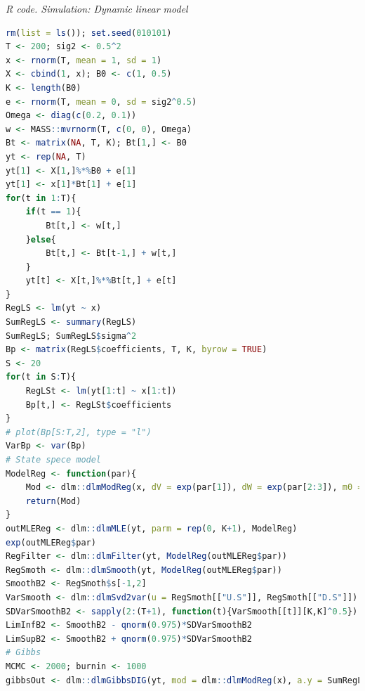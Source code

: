 \begin{tcolorbox}[enhanced,width=4.67in,center upper,
	fontupper=\large\bfseries,drop shadow southwest,sharp corners]
	\textit{R code. Simulation: Dynamic linear model}
	\begin{VF}
		\begin{lstlisting}[language=R]
rm(list = ls()); set.seed(010101)
T <- 200; sig2 <- 0.5^2
x <- rnorm(T, mean = 1, sd = 1) 
X <- cbind(1, x); B0 <- c(1, 0.5)
K <- length(B0)
e <- rnorm(T, mean = 0, sd = sig2^0.5)
Omega <- diag(c(0.2, 0.1))
w <- MASS::mvrnorm(T, c(0, 0), Omega)
Bt <- matrix(NA, T, K); Bt[1,] <- B0
yt <- rep(NA, T) 
yt[1] <- X[1,]%*%B0 + e[1]
yt[1] <- x[1]*Bt[1] + e[1]
for(t in 1:T){
	if(t == 1){
		Bt[t,] <- w[t,]
	}else{
		Bt[t,] <- Bt[t-1,] + w[t,]
	}
	yt[t] <- X[t,]%*%Bt[t,] + e[t]
}
RegLS <- lm(yt ~ x)
SumRegLS <- summary(RegLS)
SumRegLS; SumRegLS$sigma^2  
Bp <- matrix(RegLS$coefficients, T, K, byrow = TRUE)
S <- 20
for(t in S:T){
	RegLSt <- lm(yt[1:t] ~ x[1:t])
	Bp[t,] <- RegLSt$coefficients 
}
# plot(Bp[S:T,2], type = "l")
VarBp <- var(Bp)
# State spece model
ModelReg <- function(par){
	Mod <- dlm::dlmModReg(x, dV = exp(par[1]), dW = exp(par[2:3]), m0 = RegLS$coefficients,	C0 = VarBp)
	return(Mod)
}
outMLEReg <- dlm::dlmMLE(yt, parm = rep(0, K+1), ModelReg)
exp(outMLEReg$par)
RegFilter <- dlm::dlmFilter(yt, ModelReg(outMLEReg$par))
RegSmoth <- dlm::dlmSmooth(yt, ModelReg(outMLEReg$par))
SmoothB2 <- RegSmoth$s[-1,2]
VarSmooth <- dlm::dlmSvd2var(u = RegSmoth[["U.S"]], RegSmoth[["D.S"]])
SDVarSmoothB2 <- sapply(2:(T+1), function(t){VarSmooth[[t]][K,K]^0.5}) 
LimInfB2 <- SmoothB2 - qnorm(0.975)*SDVarSmoothB2
LimSupB2 <- SmoothB2 + qnorm(0.975)*SDVarSmoothB2
# Gibbs
MCMC <- 2000; burnin <- 1000
gibbsOut <- dlm::dlmGibbsDIG(yt, mod = dlm::dlmModReg(x), a.y = SumRegLS$sigma^2, b.y = 10*SumRegLS$sigma^2, a.theta = max(diag(VarBp)), b.theta = 10*max(diag(VarBp)), n.sample = MCMC, thin = 5, save.states = TRUE)
\end{lstlisting}
	\end{VF}
\end{tcolorbox} 
 
